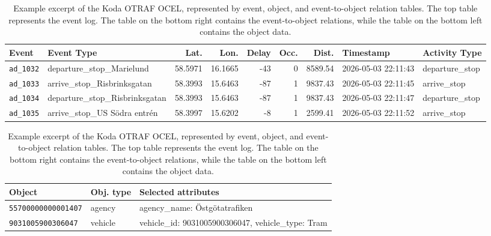 \begin{table}[htbp]
  \caption{Example excerpt of the Koda OTRAF OCEL, represented by event, object, and event-to-object relation tables. The top table represents the event log. The table on the bottom right contains the event-to-object relations, while the table on the bottom left contains the object data.}
  \label{tab:kodak-ocel-example}
  \centering
  \scriptsize

{\scriptsize
\setlength{\tabcolsep}{2.5pt}
\begin{tabularx}{\textwidth}{p{1.15cm} p{3.05cm} r r r r r p{2.25cm} p{1.85cm}}
  \toprule
  \textbf{Event} & \textbf{Event Type} & \textbf{Lat.} & \textbf{Lon.} & \textbf{Delay} & \textbf{Occ.} & \textbf{Dist.} & \textbf{Timestamp} & \textbf{Activity Type} \\
  \midrule
  \texttt{ad\_1032} & departure\_stop\_Marielund      & 58.5971 & 16.1665 & -43 & 0 & 8589.54 & 2026-05-03 22:11:43 & departure\_stop \\
  \texttt{ad\_1033} & arrive\_stop\_Risbrinksgatan    & 58.3993 & 15.6463 & -87 & 1 & 9837.43 & 2026-05-03 22:11:45 & arrive\_stop \\
  \texttt{ad\_1034} & departure\_stop\_Risbrinksgatan & 58.3993 & 15.6463 & -87 & 1 & 9837.43 & 2026-05-03 22:11:47 & departure\_stop \\
  \texttt{ad\_1035} & arrive\_stop\_US Södra entrén   & 58.3997 & 15.6202 & -8  & 1 & 2599.41 & 2026-05-03 22:11:52 & arrive\_stop \\
  \bottomrule
\end{tabularx}
}

  \vspace{0.8em}

  \begin{minipage}[t]{.58\textwidth}
    \strut\vspace*{-\baselineskip}\newline

    \begin{tabularx}{\textwidth}{p{2.3cm}p{1.35cm}X}
    \toprule
    \textbf{Object} & \textbf{Obj. type} & \textbf{Selected attributes} \\
    \midrule
      \texttt{55700000000001407} & agency   & agency\_name: Östgötatrafiken \\
  \texttt{9031005900306047}  & vehicle  & vehicle\_id: 9031005900306047, vehicle\_type: Tram \\
  

\end{tabularx}
\end{minipage}
\end{table}
